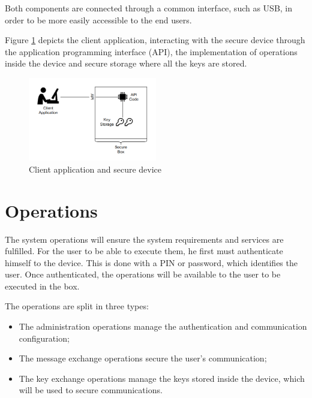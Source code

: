 Both components are connected through a common interface, such as USB, in order to be more easily accessible to the end users.

Figure \ref{fig:securebox} depicts the client application, interacting with the secure device through the application programming interface (API), the implementation of operations inside the device and secure storage where all the keys are stored.
\begin{figure}[h]
    \centering
    \includegraphics[width=0.5\textwidth]{./Images/securebox.png}
    \caption{Client application and secure device}
    \label{fig:securebox}
\end{figure}


\section{Operations} \label{chap:arch:operations}

The system operations will ensure the system requirements and services are fulfilled.
For the user to be able to execute them, he first must authenticate himself to the device. This is done with a PIN or password, which identifies the user. Once authenticated, the operations will be available to the user to be executed in the box.

The operations are split in three types:
\begin{itemize}
    \item The administration operations manage the authentication and communication configuration;
    \item The message exchange operations secure the user's communication;
    \item The key exchange operations manage the keys stored inside the device, which will be used to secure communications.
\end{itemize}

